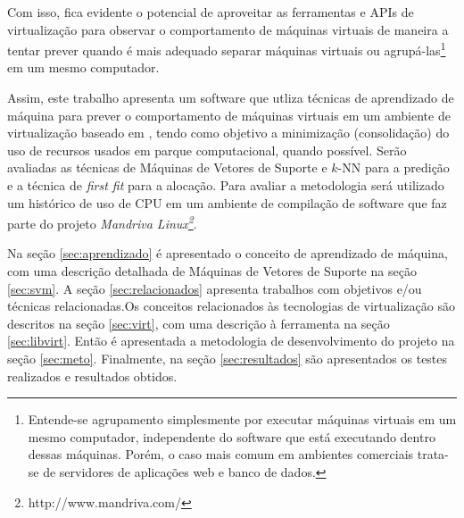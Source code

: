 Com isso, fica evidente o potencial de aproveitar as ferramentas e APIs de
virtualização para observar o comportamento de máquinas virtuais de maneira
a tentar prever quando é mais adequado separar máquinas virtuais ou
agrupá-las\footnote{Entende-se agrupamento simplesmente por
executar máquinas virtuais em um mesmo computador, independente do software
que está executando dentro dessas máquinas. Porém, o caso mais comum em
ambientes comerciais trata-se de servidores de aplicações web e banco de
dados.} em um mesmo computador. 

Assim, este trabalho apresenta um software que utliza técnicas de
aprendizado de máquina para prever o comportamento de máquinas
virtuais em um ambiente de virtualização baseado em \libvirt{}, tendo como
objetivo a minimização (consolidação) do uso de recursos usados em parque
computacional, quando possível. Serão avaliadas as técnicas de Máquinas de
Vetores de Suporte e $k$-NN para a predição e a técnica de \emph{first fit} para
a alocação. Para avaliar a metodologia será utilizado um histórico de uso de CPU
em um ambiente de compilação de software que faz parte do projeto \emph{Mandriva
Linux\footnote{http://www.mandriva.com/}}.

Na seção \ref{sec:aprendizado} é apresentado o conceito de aprendizado de
máquina, com uma descrição detalhada de Máquinas de Vetores de Suporte na seção
\ref{sec:svm}. A seção \ref{sec:relacionados} apresenta trabalhos com objetivos
e/ou técnicas relacionadas.Os conceitos relacionados às tecnologias de
virtualização são descritos na seção \ref{sec:virt}, com uma descrição à
ferramenta \libvirt{} na seção \ref{sec:libvirt}. Então é apresentada a
metodologia de desenvolvimento do projeto na seção \ref{sec:meto}. Finalmente,
na seção \ref{sec:resultados} são apresentados os testes realizados e resultados
obtidos.
